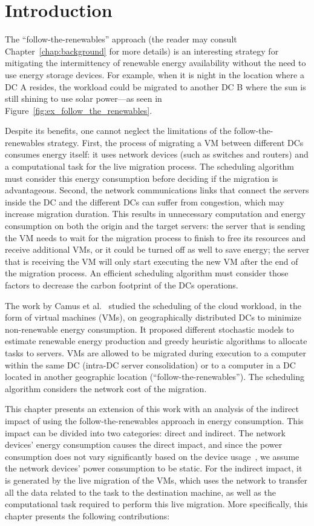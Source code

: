 \section{Introduction}

The ``follow-the-renewables'' approach (the reader may consult Chapter~\ref{chap:background} for more details) is an interesting strategy for mitigating the intermittency of renewable energy availability without the need to use energy storage devices. For example, when it is night in the location where a DC A resides, the workload could be migrated to another DC B where the sun is still shining to use solar power---as seen in Figure~\ref{fig:ex_follow_the_renewables}.

Despite its benefits, one cannot neglect the limitations of the follow-the-renewables strategy. First, the process of migrating a VM between different DCs consumes energy itself: it uses network devices (such as switches and routers) and a computational task for the live migration process. The scheduling algorithm must consider this energy consumption before deciding if the migration is advantageous. Second, the network communications links that connect the servers inside the DC and the different DCs can suffer from congestion, which may increase migration duration. This results in unnecessary computation and energy consumption on both the origin and the target servers: the server that is sending the VM needs to wait for the migration process to finish to free its resources and receive additional VMs, or it could be turned off as well to save energy; the server that is receiving the VM will only start executing the new VM after the end of the migration process. An efficient scheduling algorithm must consider those factors to decrease the carbon footprint of the DCs operations.


The work by Camus et al.~\citet{SAGITTA,NEMESIS} studied the scheduling of the cloud workload, in the form of virtual machines (VMs), on geographically distributed DCs to minimize non-renewable energy consumption. It proposed different stochastic models to estimate renewable energy production and greedy heuristic algorithms to allocate tasks to servers. VMs are allowed to be migrated during execution to a computer within the same DC (intra-DC server consolidation)  or to a computer in a DC located in another geographic location (``follow-the-renewables''). The scheduling algorithm considers the network cost of the migration.


This chapter presents an extension of this work with an analysis of the indirect impact of using the follow-the-renewables approach in energy consumption. This impact can be divided into two categories: direct and indirect. The network devices' energy consumption causes the direct impact, and since the power consumption does not vary significantly based on the device usage~\cite{energy_network_devices}, we assume the network devices' power consumption to be static. For the indirect impact, it is generated by the live migration of the VMs, which uses the network to transfer all the data related to the task to the destination machine, as well as the computational task required to perform this live migration. More specifically, this chapter presents the following contributions:



